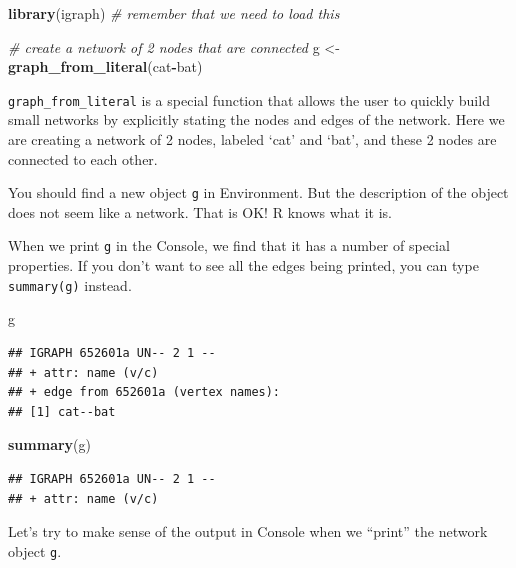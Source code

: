 \documentclass[
]{book}
\newenvironment{Shaded}{\begin{snugshade}}{\end{snugshade}}
\newcommand{\CommentTok}[1]{\textcolor[rgb]{0.56,0.35,0.01}{\textit{#1}}}
\newcommand{\FunctionTok}[1]{\textcolor[rgb]{0.13,0.29,0.53}{\textbf{#1}}}
\newcommand{\NormalTok}[1]{#1}
\newcommand{\OtherTok}[1]{\textcolor[rgb]{0.56,0.35,0.01}{#1}}
\newcommand{\SpecialCharTok}[1]{\textcolor[rgb]{0.81,0.36,0.00}{\textbf{#1}}}
\newcommand{\StringTok}[1]{\textcolor[rgb]{0.31,0.60,0.02}{#1}}
\begin{document}
\begin{Shaded}
\begin{Highlighting}[]
\FunctionTok{library}\NormalTok{(igraph) }\CommentTok{\# remember that we need to load this}

\CommentTok{\# create a network of 2 nodes that are connected}
\NormalTok{g }\OtherTok{\textless{}{-}} \FunctionTok{graph\_from\_literal}\NormalTok{(}\StringTok{\textquotesingle{}cat\textquotesingle{}}\SpecialCharTok{{-}}\StringTok{\textquotesingle{}bat\textquotesingle{}}\NormalTok{)}
\end{Highlighting}
\end{Shaded}

\texttt{graph\_from\_literal} is a special function that allows the user to quickly build small networks by explicitly stating the nodes and edges of the network. Here we are creating a network of 2 nodes, labeled `cat' and `bat', and these 2 nodes are connected to each other.

You should find a new object \texttt{g} in Environment. But the description of the object does not seem like a network. That is OK! R knows what it is.

When we print \texttt{g} in the Console, we find that it has a number of special properties. If you don't want to see all the edges being printed, you can type \texttt{summary(g)} instead.

\begin{Shaded}
\begin{Highlighting}[]
\NormalTok{g}
\end{Highlighting}
\end{Shaded}

\begin{verbatim}
## IGRAPH 652601a UN-- 2 1 -- 
## + attr: name (v/c)
## + edge from 652601a (vertex names):
## [1] cat--bat
\end{verbatim}

\begin{Shaded}
\begin{Highlighting}[]
\FunctionTok{summary}\NormalTok{(g)}
\end{Highlighting}
\end{Shaded}

\begin{verbatim}
## IGRAPH 652601a UN-- 2 1 -- 
## + attr: name (v/c)
\end{verbatim}

Let's try to make sense of the output in Console when we ``print'' the network object \texttt{g}.
\end{document}
